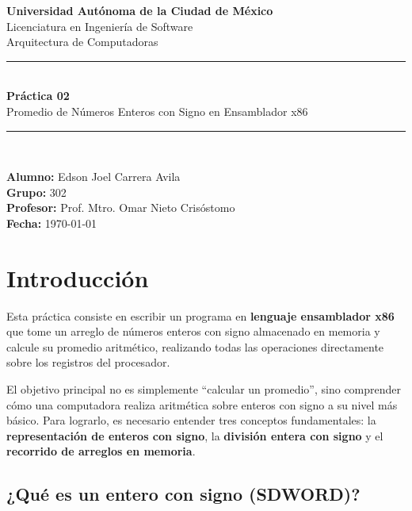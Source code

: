 \documentclass[12pt, letterpaper]{article}
\begin{document}
\begin{titlepage}
    \centering
    \vspace*{1.5cm}

    {\Large \textbf{Universidad Autónoma de la Ciudad de México}}\\[0.3cm]
    {\large Licenciatura en Ingeniería de Software}\\[0.2cm]
    {\large Arquitectura de Computadoras}\\[2.5cm]

    \rule{\linewidth}{0.5pt}\\[0.4cm]
    {\LARGE \bfseries Práctica 02}\\[0.3cm]
    {\Large Promedio de Números Enteros con Signo en Ensamblador x86}\\[0.3cm]
    \rule{\linewidth}{0.5pt}\\[2cm]

    \begin{flushleft}
        \textbf{Alumno:} Edson Joel Carrera Avila \\[0.3cm]
        \textbf{Grupo:} 302 \\[0.3cm]
        \textbf{Profesor:} Prof. Mtro. Omar Nieto Crisóstomo \\[0.3cm]
        \textbf{Fecha:} \today
    \end{flushleft}
    \vfill
\end{titlepage}

\tableofcontents
\newpage

\section{Introducción}

Esta práctica consiste en escribir un programa en \textbf{lenguaje ensamblador x86} que tome un arreglo de números enteros con signo almacenado en memoria y calcule su promedio aritmético, realizando todas las operaciones directamente sobre los registros del procesador.

El objetivo principal no es simplemente ``calcular un promedio'', sino comprender cómo una computadora realiza aritmética sobre enteros con signo a su nivel más básico. Para lograrlo, es necesario entender tres conceptos fundamentales: la \textbf{representación de enteros con signo}, la \textbf{división entera con signo} y el \textbf{recorrido de arreglos en memoria}.

\subsection*{¿Qué es un entero con signo (SDWORD)?}
\end{document}
